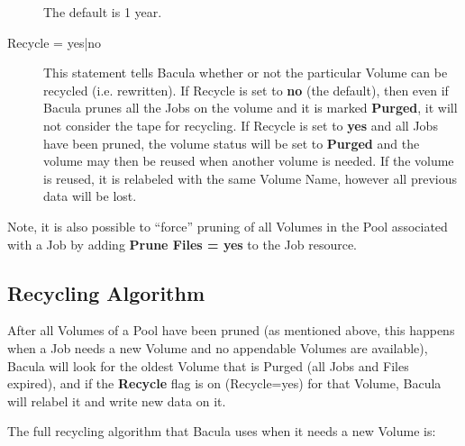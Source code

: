 \begin{description}
The default is 1 year. 

\item [Recycle = \lt{}yes|no\gt{}]
   This statement tells Bacula  whether or not the particular Volume can be
recycled (i.e.  rewritten). If Recycle is set to {\bf no}  (the default), then
even if Bacula prunes all the Jobs  on the volume and it is marked {\bf
Purged}, it will not  consider the tape for recycling. If Recycle is set to
{\bf yes}  and all Jobs have been pruned, the volume status will be set to 
{\bf Purged} and the volume may then be reused when another  volume is needed.
If the volume is reused, it is relabeled with  the same Volume Name, however
all previous data will be lost. 
\end{description}

Note, it is also possible to ``force'' pruning of all Volumes in the Pool
associated with a Job by adding {\bf Prune Files = yes} to the Job resource. 
\label{Recycling}

\subsection*{Recycling Algorithm}

After all Volumes of a Pool have been pruned (as mentioned above, this happens
when a Job needs a new Volume and no appendable Volumes are available), Bacula
will look for the oldest Volume that is Purged (all Jobs and Files expired),
and if the {\bf Recycle} flag is on (Recycle=yes) for that Volume, Bacula will
relabel it and write new data on it. 

The full recycling algorithm that Bacula uses when it needs a new Volume is: 

